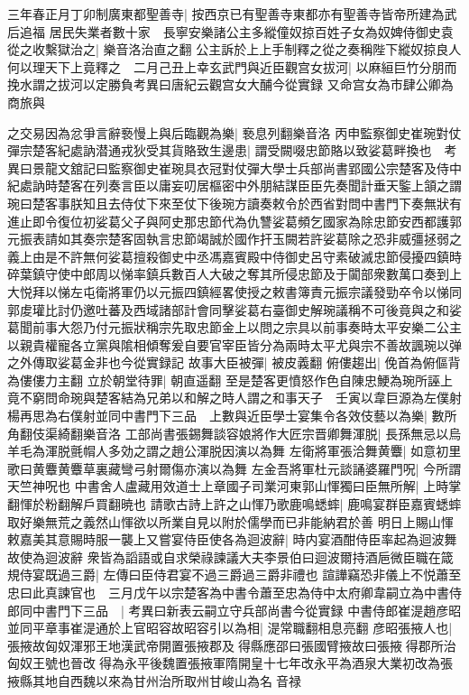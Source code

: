 三年春正月丁卯制廣東都聖善寺|{
	按西京已有聖善寺東都亦有聖善寺皆帝所建為武后追福}
居民失業者數十家　長寧安樂諸公主多縱僮奴掠百姓子女為奴婢侍御史袁從之收繫獄治之|{
	樂音洛治直之翻}
公主訴於上上手制釋之從之奏稱陛下縱奴掠良人何以理天下上竟釋之　二月己丑上幸玄武門與近臣觀宫女拔河|{
	以麻絙巨竹分朋而挽水謂之拔河以定勝負考異曰唐紀云觀宫女大酺今從實録}
又命宫女為市肆公卿為商旅與

之交易因為忿爭言辭䙝慢上與后臨觀為樂|{
	䙝息列翻樂音洛}
丙申監察御史崔琬對仗彈宗楚客紀處訥潜通戎狄受其貨賂致生邊患|{
	謂受闕啜忠節賂以致娑葛畔換也　考異曰景龍文舘記曰監察御史崔琬具衣冠對仗彈大學士兵部尚書郢國公宗楚客及侍中紀處訥時楚客在列奏言臣以庸妄叨居樞密中外朋結謀臣臣先奏聞計垂天鍳上頷之謂琬曰楚客事朕知且去侍仗下來至仗下後琬方讀奏敕令於西省對問中書門下奏無狀有進止即令復位初娑葛父子與阿史那忠節代為仇讐娑葛頻乞國家為除忠節安西都護郭元振表請如其奏宗楚客固執言忠節竭誠於國作扞玉闕若許娑葛除之恐非威彊拯弱之義上由是不許無何娑葛擅殺御史中丞馮嘉賓殿中侍御史呂守素破滅忠節侵擾四鎮時碎葉鎮守使中郎周以悌率鎮兵數百人大破之奪其所侵忠節及于闐部衆數萬口奏到上大悦拜以悌左屯衛將軍仍以元振四鎮經畧使授之敕書簿責元振宗議發勁卒令以悌同郭䖍瓘比討仍邀吐蕃及西域諸部計會同擊娑葛右臺御史解琬議稱不可後竟與之和娑葛聞前事大怨乃付元振狀稱宗先取忠節金上以問之宗具以前事奏時太平安樂二公主以親貴權寵各立黨與隂相傾奪爰自要官宰臣皆分為兩時太平尤與宗不善故諷琬以弹之外傳取娑葛金非也今從實録記}
故事大臣被彈|{
	被皮義翻}
俯僂趨出|{
	俛首為俯傴背為僂僂力主翻}
立於朝堂待罪|{
	朝直遥翻}
至是楚客更憤怒作色自陳忠鯁為琬所誣上竟不窮問命琬與楚客結為兄弟以和解之時人謂之和事天子　壬寅以韋巨源為左僕射楊再思為右僕射並同中書門下三品　上數與近臣學士宴集令各效伎藝以為樂|{
	數所角翻伎渠綺翻樂音洛}
工部尚書張錫舞談容娘將作大匠宗晋卿舞渾脱|{
	長孫無忌以烏羊毛為渾脱氈㡌人多効之謂之趙公渾脱因演以為舞}
左衛將軍張洽舞黄麞|{
	如意初里歌曰黄麞黄麞草裏藏彎弓射爾傷亦演以為舞}
左金吾將軍杜元談誦婆羅門呪|{
	今所謂天竺神呪也}
中書舍人盧藏用效道士上章國子司業河東郭山惲獨曰臣無所解|{
	上時掌翻惲於粉翻解戶買翻暁也}
請歌古詩上許之山惲乃歌鹿鳴蟋蟀|{
	鹿鳴宴群臣嘉賓蟋蟀取好樂無荒之義然山惲欲以所業自見以附於儒學而已非能納君於善}
明日上賜山惲敕嘉美其意賜時服一襲上又嘗宴侍臣使各為迴波辭|{
	時内宴酒酣侍臣率起為迴波舞故使為迴波辭}
衆皆為謟語或自求榮祿諫議大夫李景伯曰迴波爾持酒巵微臣職在箴規侍宴既過三爵|{
	左傳曰臣侍君宴不過三爵過三爵非禮也}
諠譁竊恐非儀上不悦蕭至忠曰此真諫官也　三月戊午以宗楚客為中書令蕭至忠為侍中太府卿韋嗣立為中書侍郎同中書門下三品　|{
	考異曰新表云嗣立守兵部尚書今從實録}
中書侍郎崔湜趙彦昭並同平章事崔湜通於上官昭容故昭容引以為相|{
	湜常職翻相息亮翻}
彦昭張掖人也|{
	張掖故匈奴渾邪王地漢武帝開置張掖郡及得縣應邵曰張國臂掖故曰張掖得郡所治匈奴王號也晉改得為永平後魏置張掖軍隋開皇十七年改永平為酒泉大業初改為張掖縣其地自西魏以來為甘州治所取州甘峻山為名音禄}
